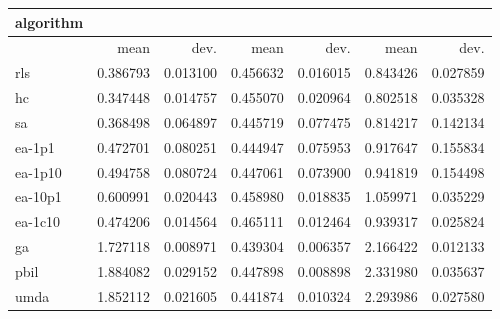 \begin{tabular}{@{}l*{6}{>{{}}N{1}{2}}@{}}
\toprule
{algorithm} &  &  &  \\
\midrule
& {mean} & {dev.} & {mean} & {dev.} & {mean} & {dev.} \\
\midrule
rls & 0.386793 & 0.013100 & 0.456632 & 0.016015 & 0.843426 & 0.027859 \\
 hc & 0.347448 & 0.014757 & 0.455070 & 0.020964 & 0.802518 & 0.035328 \\
 sa & 0.368498 & 0.064897 & 0.445719 & 0.077475 & 0.814217 & 0.142134 \\
 ea-1p1 & 0.472701 & 0.080251 & 0.444947 & 0.075953 & 0.917647 & 0.155834 \\
 ea-1p10 & 0.494758 & 0.080724 & 0.447061 & 0.073900 & 0.941819 & 0.154498 \\
 ea-10p1 & 0.600991 & 0.020443 & 0.458980 & 0.018835 & 1.059971 & 0.035229 \\
 ea-1c10 & 0.474206 & 0.014564 & 0.465111 & 0.012464 & 0.939317 & 0.025824 \\
 ga & 1.727118 & 0.008971 & 0.439304 & 0.006357 & 2.166422 & 0.012133 \\
 pbil & 1.884082 & 0.029152 & 0.447898 & 0.008898 & 2.331980 & 0.035637 \\
 umda & 1.852112 & 0.021605 & 0.441874 & 0.010324 & 2.293986 & 0.027580 \\
 \bottomrule
\end{tabular}
